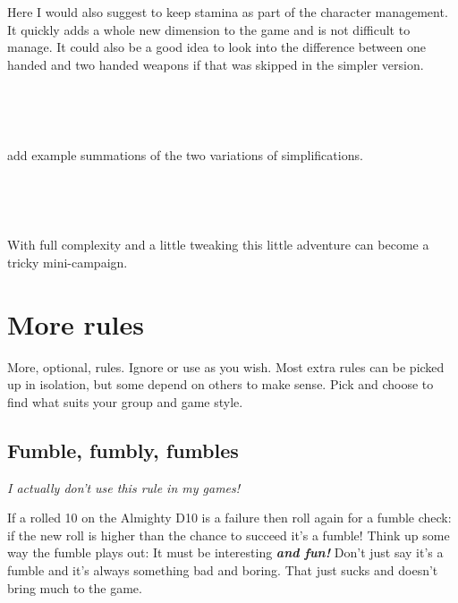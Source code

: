 Here I would also suggest to keep stamina as part of the character management. It quickly adds a whole new dimension to the game and is not difficult to manage. It could also be a good idea to look into the difference between one handed and two handed weapons if that was skipped in the simpler version.

\

\

\todo add example summations of the two variations of simplifications.

\

\

With full complexity and a little tweaking this little adventure can become a tricky mini-campaign. 
















\clearpage
\section*{More rules}

More, optional, rules. Ignore or use as you wish. Most extra rules can be picked up in isolation, but some depend on others to make sense. Pick and choose to find what suits your group and game style.


\subsection*{Fumble, fumbly, fumbles}
\emph{I actually don't use this rule in my games!}

If a rolled 10 on the Almighty D10 is a failure then roll again for a fumble check: if the new roll is higher than the chance to succeed it's a fumble! Think up some way the fumble plays out: It must be interesting \textit{\textbf{and fun!}} Don't just say it's a fumble and it's always something bad and boring. That just sucks and doesn't bring much to the game.

